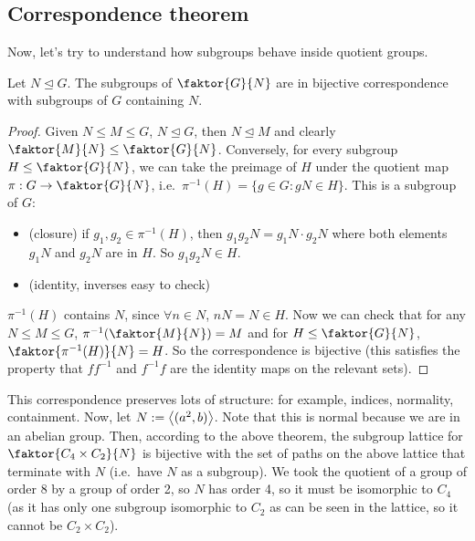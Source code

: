 \subsection{Correspondence theorem}
Now, let's try to understand how subgroups behave inside quotient groups.
\begin{theorem}
	Let \(N \trianglelefteq G\).
	The subgroups of \(\faktor{G}{N}\) are in bijective correspondence with subgroups of \(G\) containing \(N\).
\end{theorem}
\begin{proof}
	Given \(N \leq M \leq G\), \(N \trianglelefteq G\), then \(N \trianglelefteq M\) and clearly \(\faktor{M}{N} \leq \faktor{G}{N}\).
	Conversely, for every subgroup \(H \leq \faktor{G}{N}\), we can take the preimage of \(H\) under the quotient map \(\pi : G \to \faktor{G}{N}\), i.e.\ \(\pi^{-1}(H) = \{ g \in G : gN \in H \}\).
	This is a subgroup of \(G\):
	\begin{itemize}
		\item (closure) if \(g_1, g_2 \in \pi^{-1}(H)\), then \(g_1g_2N = g_1N\cdot g_2N\) where both elements \(g_1N\) and \(g_2N\) are in \(H\).
		      So \(g_1g_2N \in H\).
		\item (identity, inverses easy to check)
	\end{itemize}
	\(\pi^{-1}(H)\) contains \(N\), since \(\forall n \in N\), \(nN = N \in H\).
	Now we can check that for any \(N \leq M \leq G\), \(\pi^{-1}(\faktor{M}{N}) = M\) and for \(H \leq \faktor{G}{N}\), \(\faktor{\pi^{-1}(H)}{N} = H\).
	So the correspondence is bijective (this satisfies the property that \(ff^{-1}\) and \(f^{-1}f\) are the identity maps on the relevant sets).
\end{proof}
This correspondence preserves lots of structure: for example, indices, normality, containment.
Now, let \(N := \left\langle{} (a^2, b) \right\rangle\).
Note that this is normal because we are in an abelian group.
Then, according to the above theorem, the subgroup lattice for \(\faktor{C_4 \times C_2}{N}\) is bijective with the set of paths on the above lattice that terminate with \(N\) (i.e.\ have \(N\) as a subgroup).
We took the quotient of a group of order 8 by a group of order 2, so \(N\) has order 4, so it must be isomorphic to \(C_4\) (as it has only one subgroup isomorphic to \(C_2\) as can be seen in the lattice, so it cannot be \(C_2 \times C_2\)).

